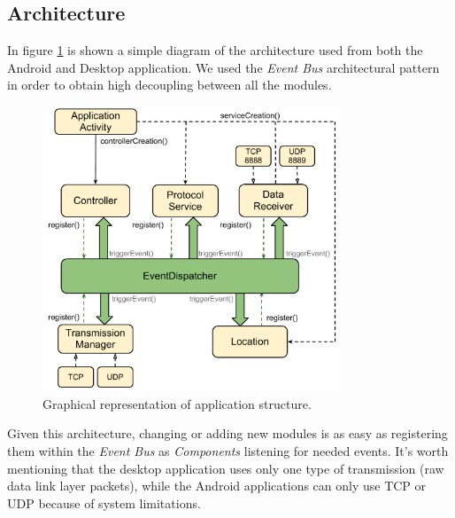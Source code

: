\subsection{Architecture}

In figure \ref{fig:architecture} is shown a simple diagram of the architecture used from both the Android and Desktop application. We used the \textit{Event Bus} architectural pattern in order to obtain high decoupling between all the modules.

\begin{figure}[htbp]
	\centering
	\includegraphics[trim = 10mm 0mm 0mm 0mm,width=3.5in]{imgs/components_architecture.pdf}
	\caption{Graphical representation of application structure.}
	\label{fig:architecture}
\end{figure}

Given this architecture, changing or adding new modules is as easy as registering them within the \textit{Event Bus} as \textit{Components} listening for needed events. It's worth mentioning that the desktop application uses only one type of transmission (raw data link layer packets), while the Android applications can only use TCP or UDP because of system limitations.

